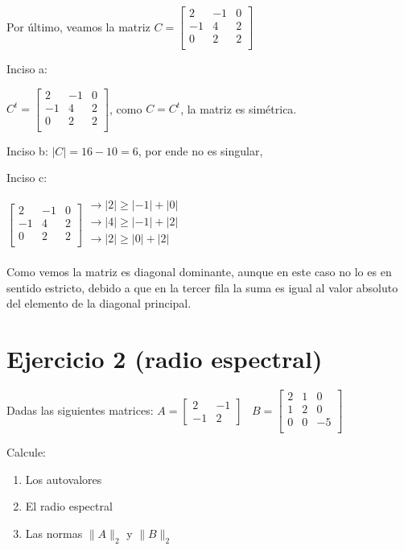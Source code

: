 \documentclass[11pt]{article}
\begin{document}
	Por último, veamos la matriz $C=\begin{bmatrix}
		2 & -1 & 0 \\
		-1 & 4 & 2 \\
		0 & 2 & 2 \\
	\end{bmatrix}$

	Inciso a:
	
	$C^t=\begin{bmatrix}
		2 & -1 & 0 \\
		-1 & 4 & 2 \\
		0 & 2 & 2 \\
	\end{bmatrix}$, como $C=C^t$, la matriz es simétrica.

	Inciso b: $|C|=16-10=6$, por ende no es singular,
	
	Inciso c:
	
	$\begin{bmatrix}
		2 & -1 & 0 \\
		-1 & 4 & 2 \\
		0 & 2 & 2 \\
		\end{bmatrix}$$
	\begin{matrix}
		\rightarrow |2| \ge |-1| + |0| \\
		\rightarrow |4| \ge |-1| + |2| \\
		\rightarrow |2| \ge |0| + |2| \\
		\end{matrix}
	$
	
	Como vemos la matriz es diagonal dominante, aunque en este caso no lo es en sentido estricto, debido a que en la tercer fila la suma es igual al valor absoluto del elemento de la diagonal principal.
	
	\section{Ejercicio 2 (radio espectral)}
	Dadas las siguientes matrices: $A=\begin{bmatrix}
		2 & -1\\
		-1 & 2
	\end{bmatrix} \;\;\; B=\begin{bmatrix}
	2 & 1 & 0 \\
	1 & 2 & 0 \\
	0 & 0 & -5 \\
\end{bmatrix}$

	Calcule:
	\begin{enumerate}[label=\alph*)]
		\item Los autovalores
		\item El radio espectral
		\item Las normas $\lVert A \rVert_{2}$ y $\lVert B \rVert_{2}$
	\end{enumerate}
\end{document}
